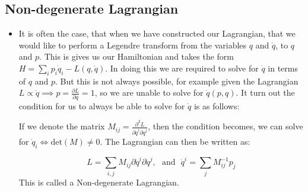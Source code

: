 \documentclass[11pt]{article}
\numberwithin{equation}{section}
\begin{document}
\subsection{Non-degenerate Lagrangian}
\begin{itemize}
  \item It is often the case, that when we have constructed our Lagrangian, that we would like to perform a Legendre transform from the variables $q$ and $\dot{q}$, to $q$ and $p$. This is gives us our Hamiltonian and takes the form $H =\sum_i p_i \dot{q}_i  - L(q,\dot{q})$. In doing this we are required to solve for $\dot{q}$ in terms of $q$ and $p$. But this is not always possible, for example given the Lagrangian $L \propto \dot{q} \implies p = \frac{\partial L}{\partial q} = 1$, so we are unable to solve for $\dot{q}(p,q)$. It turn out the condition for us to always be able to solve for $\dot{q}$ is as follows:

  If we denote the matrix $M_{ij} = \frac{\partial^2 L}{\partial\dot{q}^i\partial\dot{q}^j}$, then the condition becomes, we can solve for $\dot{q}_{i} \iff \text{det}(M) \neq 0$. The Lagrangian can then be written as:

  \begin{equation*}
  L = \sum_{i,j}M_{ij}\partial\dot{q}^i\partial\dot{q}^j, ~~~ \text{and}~~~ \dot{q}^i  = \sum_{j}M^{-1}_{ij}p_j
  \end{equation*}
  This is called a Non-degenerate Lagrangian. 
\end{itemize}
\end{document}
